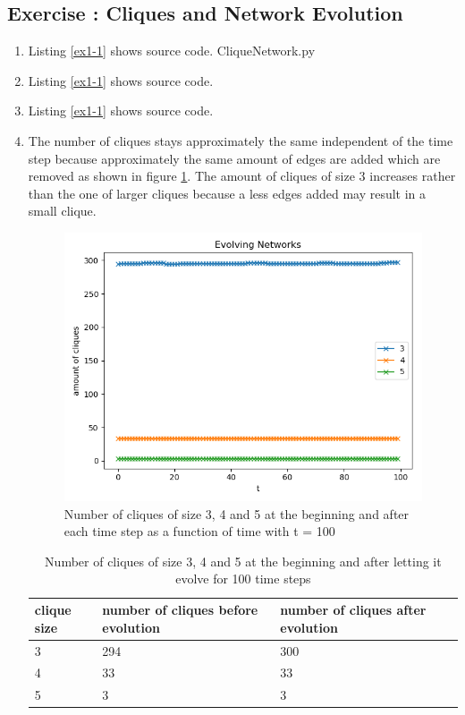 \documentclass[10pt,a4paper]{article}
\newcommand{\exercise}[1]
{
  \stepcounter{subsection}
  \subsection*{Exercise \thesubsection: #1}

}
\begin{document}
\exercise{Cliques and Network Evolution}
\begin{enumerate}
\item Listing \ref{ex1-1} shows source code.
 {CliqueNetwork.py}

\item Listing \ref{ex1-1} shows source code.

\item Listing \ref{ex1-1} shows source code.

\item The number of cliques stays approximately the same independent of the time step because approximately the same amount of edges are added which are removed as shown in figure \ref{fig-1}. The amount of cliques of size 3 increases rather than the one of larger cliques because a less edges added may result in a small clique.
\begin{figure}
\includegraphics[scale=1]{plotTask1_100.png}
\caption{Number of cliques of size 3, 4 and 5 at the beginning and after each time step as a function of time with t = 100}
\label{fig-1}
\end{figure}

\begin{table}[!h]
\label{tab1}
\begin{tabular}{llll}
clique size & number of cliques before evolution & number of cliques after evolution\\
\hline
3 & 294 & 300\\
4 & 33 & 33\\
5 & 3 & 3\\
\end{tabular}
\caption{Number of cliques of size 3, 4 and 5 at the beginning and after letting it evolve for 100 time steps}
\end{table}


\end{enumerate}
\end{document}
